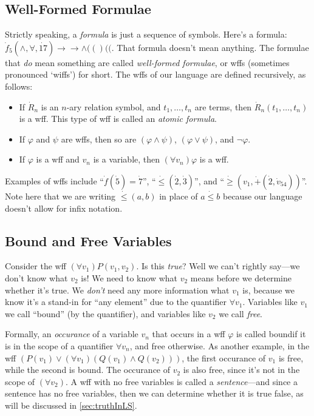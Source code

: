 \subsection{Well-Formed Formulae}
Strictly speaking, a \textit{formula} is just a sequence of symbols. Here's a formula: $\dot f_5 (\land, \forall, \dot{17})\to\to\land (()(($. That formula doesn't mean anything. The formulae that \textit{do} mean something are called \textit{well-formed formulae}, or wffs (sometimes pronounced `wiffs') for short. The wffs of our language are defined recursively, as follows:
\begin{itemize}
    \item If $\dot R_n$ is an $n$-ary relation symbol, and $t_1, \ldots, t_n$ are terms, then $\dot R_n(t_1, \ldots, t_n)$ is a wff. This type of wff is called an \textit{atomic formula}. 
    \item If $\varphi$ and $\psi$ are wffs, then so are $(\varphi \land \psi)$, $(\varphi \lor \psi)$, and $\neg \varphi$. 
    \item If $\varphi$ is a wff and $v_n$ is a variable, then $(\forall v_n) \varphi$ is a wff.
\end{itemize}

Examples of wffs include ``$\dot f (\dot 5) = \dot 7$'', ``$\dot \leq (\dot 2, \dot 3)$'', and ``$\dot \geq (v_1, \dot +(\dot 2, \dot v_{54}))$''. Note here that we are writing $\dot \leq (a, b)$ in place of $a \dot \leq b$ because our language doesn't allow for infix notation.

\subsection{Bound and Free Variables}
Consider the wff $(\forall v_1) P(v_1, v_2)$. Is this \textit{true}? Well we can't rightly say---we don't know what $v_2$ is! We need to know what $v_2$ means before we determine whether it's true. We \textit{don't} need any more information what $v_1$ is, because we know it's a stand-in for ``any element'' due to the quantifier $\forall v_1$. Variables like $v_1$ we call ``bound'' (by the quantifier), and variables like $v_2$ we call \textit{free}. 

Formally, an \textit{occurance} of a variable $v_n$ that occurs in a wff $\varphi$ is called boundif it is in the scope of a quantifier $\forall v_n$, and free otherwise. As another example, in the wff $(P(v_1) \lor (\forall v_1) (Q(v_1) \land Q(v_2)))$, the first occurance of $v_1$ is free, while the second is bound. The occurance of $v_2$ is also free, since it's not in the scope of $(\forall v_2)$. A wff with no free variables is called a \textit{sentence}---and since a sentence has no free variables, then we can determine whether it is true false, as will be discussed in \autoref{sec:truthInLS}.

